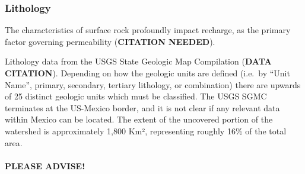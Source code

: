 \documentclass[
]{agujournal2019}
\makeatletter
\let\oldparagraph\paragraph
\renewcommand{\paragraph}{
    \@ifstar
      \xxxParagraphStar
      \xxxParagraphNoStar
  }
\newcommand{\xxxParagraphStar}[1]{\oldparagraph*{#1}\mbox{}}
\newcommand{\xxxParagraphNoStar}[1]{\oldparagraph{#1}\mbox{}}
\makeatother
\begin{document}
\subsubsection{Lithology}\label{lithology}

The characteristics of surface rock profoundly impact recharge, as the
primary factor governing permeability (\textbf{CITATION NEEDED}).

Lithology data from the USGS State Geologic Map Compilation
(\textbf{DATA CITATION}). Depending on how the geologic units are
defined (i.e.~by ``Unit Name'', primary, secondary, tertiary lithology,
or combination) there are upwards of 25 distinct geologic units which
must be classified. The USGS SGMC terminates at the US-Mexico border,
and it is not clear if any relevant data within Mexico can be located.
The extent of the uncovered portion of the watershed is approximately
1,800 Km², representing roughly 16\% of the total area.

\paragraph{\texorpdfstring{\textbf{PLEASE
ADVISE!}}{PLEASE ADVISE!}}\label{please-advise}
\end{document}
